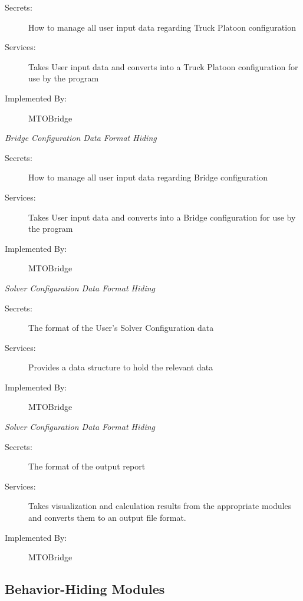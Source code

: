 \documentclass[12pt, titlepage]{article}
\begin{document}
    \begin{description}
        \item[Secrets:]How to manage all user input data regarding Truck Platoon configuration
        \item[Services:]Takes User input data and converts into a Truck Platoon configuration for use by the program
        \item[Implemented By:] MTOBridge\\
    \end{description}
    \emph{{\large Bridge Configuration Data Format Hiding}}
    \begin{description}
        \item[Secrets:]How to manage all user input data regarding Bridge configuration
        \item[Services:]Takes User input data and converts into a Bridge configuration for use by the program
        \item[Implemented By:] MTOBridge\\
    \end{description}
    \emph{{\large Solver Configuration Data Format Hiding}}
    \begin{description}
        \item[Secrets:]The format of the User's Solver Configuration data
        \item[Services:]Provides a data structure to hold the relevant data
        \item[Implemented By:] MTOBridge\\
    \end{description}
    \emph{{\large Solver Configuration Data Format Hiding}}
    \begin{description}
        \item[Secrets:]The format of the output report
        \item[Services:]Takes visualization and calculation results from the appropriate modules and converts them to an output file format.
        \item[Implemented By:] MTOBridge\\
    \end{description}

\subsection{Behavior-Hiding Modules}
\end{document}
